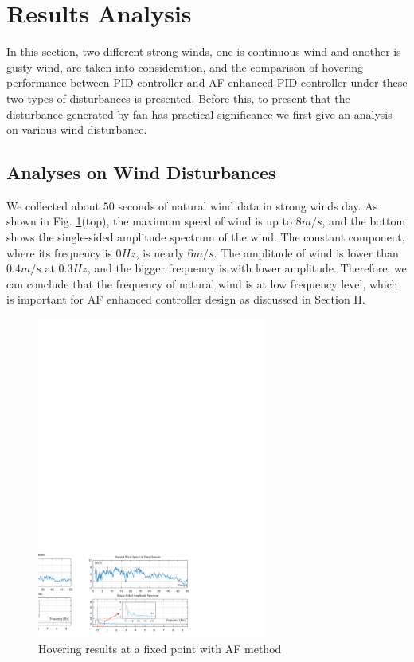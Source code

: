 \documentclass[letterpaper, 10 pt, conference]{ieeeconf}  %
\begin{document}
\section{Results Analysis}

In this section, two different strong winds, one is continuous wind and another is gusty wind, are taken into consideration, and the comparison of hovering performance between PID controller and AF enhanced PID controller under these two types of disturbances is presented.
Before this, to present that the disturbance generated by fan has practical significance we first give an analysis on various wind disturbance.

\subsection{Analyses on Wind Disturbances}

We collected about $50$ seconds of natural wind data in strong winds day.
As shown in Fig. \ref{f11}(top), the maximum speed of wind is up to $8m/s$, and the bottom shows the single-sided amplitude spectrum of the wind.
The constant component, where its frequency is $0Hz$, is nearly $6m/s$.
The amplitude of wind is lower than $0.4m/s$ at $0.3Hz$, and the bigger frequency is with lower amplitude.
Therefore, we can conclude that the frequency of natural wind is at low frequency level, which is important for AF enhanced controller design as discussed in Section II.
\begin{figure}[t]
    \centering
    \includegraphics[width=2.95in]{illustrations/fig11.pdf}
    \caption{Hovering results at a fixed point with AF method}
    \label{f11}
\end{figure}
\end{document}

